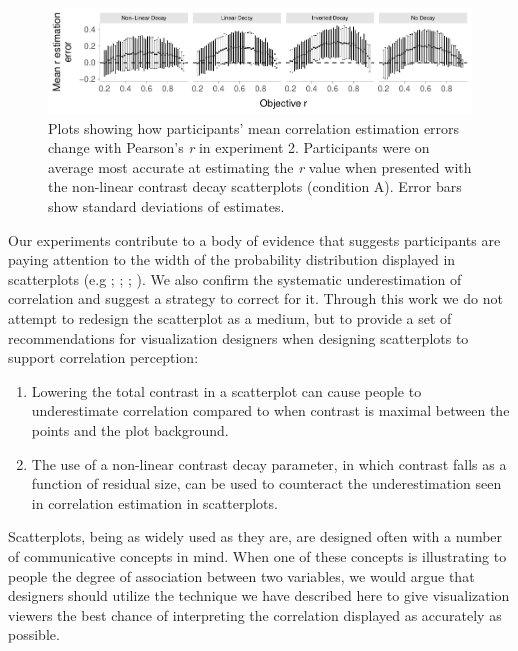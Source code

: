 \documentclass[preprint, 3p,
authoryear]{elsarticle} %
\begin{document}
\begin{figure}

{\centering \includegraphics{contrast_and_scatterplots_files/figure-latex/changes-with-r-e2-1} 

}

\caption{\label{e2-changes-plot}Plots showing how participants' mean correlation estimation errors change with Pearson's \textit{r} in experiment 2. Participants were on average most accurate at estimating the \textit{r} value when presented with the non-linear contrast decay scatterplots (condition A). Error bars show standard deviations of estimates.}\label{fig:changes-with-r-e2}
\end{figure}

Our experiments contribute to a body of evidence that suggests
participants are paying attention to the width of the probability
distribution displayed in scatterplots (e.g \citealp{cleveland_1982};
\citealp{meyer_1997}; \citealp{yang_2019}; \citealp{rensink_2017}). We
also confirm the systematic underestimation of correlation and suggest a
strategy to correct for it. Through this work we do not attempt to
redesign the scatterplot as a medium, but to provide a set of
recommendations for visualization designers when designing scatterplots
to support correlation perception:

\begin{enumerate}
\def\labelenumi{\arabic{enumi}.}
\item
  Lowering the total contrast in a scatterplot can cause people to
  underestimate correlation compared to when contrast is maximal between
  the points and the plot background.
\item
  The use of a non-linear contrast decay parameter, in which contrast
  falls as a function of residual size, can be used to counteract the
  underestimation seen in correlation estimation in scatterplots.
\end{enumerate}

Scatterplots, being as widely used as they are, are designed often with
a number of communicative concepts in mind. When one of these concepts
is illustrating to people the degree of association between two
variables, we would argue that designers should utilize the technique we
have described here to give visualization viewers the best chance of
interpreting the correlation displayed as accurately as possible.
\end{document}
